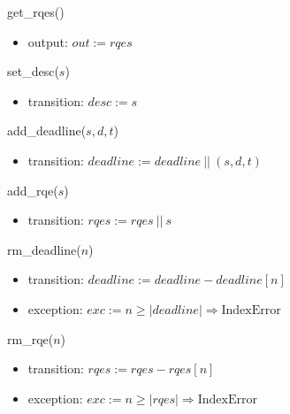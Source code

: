 \documentclass[12pt, titlepage]{article}
\begin{document}
\noindent get\_rqes()
\begin{itemize}
    \item output: $out := rqes$
\end{itemize}

\noindent set\_desc($s$)
\begin{itemize}
    \item transition: $desc := s$
\end{itemize}

\noindent add\_deadline($s, d, t$)
\begin{itemize}
    \item transition: $deadline := deadline\ ||\ (s, d, t)$
\end{itemize}

\noindent add\_rqe($s$)
\begin{itemize}
    \item transition: $rqes := rqes\ ||\ s$
\end{itemize}

\noindent rm\_deadline($n$)
\begin{itemize}
    \item transition: $deadline := deadline - deadline[n]$
    \item exception: $exc := n \geq |deadline| \Rightarrow \text{IndexError}$
\end{itemize}

\noindent rm\_rqe($n$)
\begin{itemize}
    \item transition: $rqes := rqes - rqes[n]$
    \item exception: $exc := n \geq |rqes| \Rightarrow \text{IndexError}$
\end{itemize}
\end{document}
